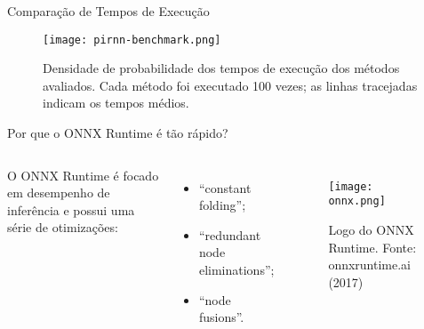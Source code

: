 \begin{frame}{Comparação de Tempos de Execução}
  \begin{figure}
    \centering
    \texttt{[image: pirnn-benchmark.png]}
    \caption{Densidade de probabilidade dos tempos de execução dos métodos avaliados. Cada método foi executado 100 vezes; as linhas tracejadas indicam os tempos médios.}
  \end{figure}
\end{frame}

\begin{frame}{Por que o ONNX Runtime é tão rápido?}
  \begin{columns}
    O ONNX Runtime é focado em desempenho de inferência e possui uma série de otimizações:
    \begin{itemize}
      \item ``constant folding'';
      \item ``redundant node eliminations'';
      \item ``node fusions''.
    \end{itemize}

    \begin{figure}
      \centering
      \texttt{[image: onnx.png]}
      \caption{Logo do ONNX Runtime. Fonte: onnxruntime.ai (2017)}
    \end{figure}

  \end{columns}
\end{frame}